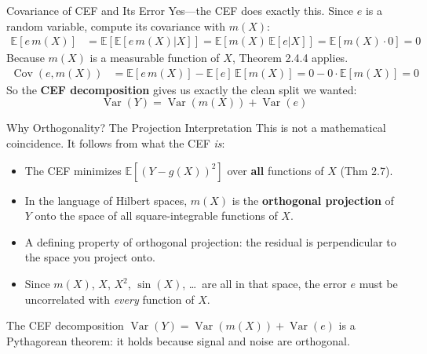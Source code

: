 \documentclass[aspectratio=169, handout, t]{beamer}
\numberwithin{equation}{section}
\begin{document}
\begin{frame}{Covariance of CEF and Its Error}
Yes---the CEF does exactly this.  Since $e$ is a random variable, compute its covariance with $m(X)$:
\begin{align*}
\mathbb{E}[e\, m(X)] & =  \mathbb{E}[\mathbb{E}[e\, m(X)|X]]=\mathbb{E}[m(X)\,\mathbb{E}[e|X]]=\mathbb{E}[m(X)\cdot 0]=0
\end{align*}\pause
Because $m(X)$ is a measurable function of $X$, Theorem 2.4.4 applies.\pause
\begin{align*}
\operatorname{Cov}(e , m(X)) & =  \mathbb{E}[e\, m(X)]- \mathbb{E}[e]\,\mathbb{E}[m(X)]=0- 0\cdot\mathbb{E}[m(X)]=0
\end{align*}\pause
So the \textbf{CEF decomposition} gives us exactly the clean split we wanted:
$$\operatorname{Var}(Y)=\operatorname{Var}(m(X))+\operatorname{Var}(e)$$
\end{frame}

\begin{frame}{Why Orthogonality? The Projection Interpretation}
This is not a mathematical coincidence.  It follows from what the CEF \emph{is}:

\begin{itemize}
\item The CEF minimizes $\mathbb{E}[(Y - g(X))^2]$ over \textbf{all} functions of $X$ (Thm 2.7).
\item In the language of Hilbert spaces, $m(X)$ is the \textbf{orthogonal projection} of $Y$ onto the space of all square-integrable functions of $X$.
\pause
\item A defining property of orthogonal projection: \alert{the residual is perpendicular to the space you project onto}.
\pause
\item Since $m(X)$, $X$, $X^2$, $\sin(X)$, \ldots\ are all in that space, the error $e$ must be uncorrelated with \emph{every} function of $X$.
\end{itemize}
\pause
\medskip
\begin{tcolorbox}[colback=blue!5, colframe=blue!50]
The CEF decomposition $\operatorname{Var}(Y)=\operatorname{Var}(m(X))+\operatorname{Var}(e)$ is a Pythagorean theorem: it holds because signal and noise are orthogonal.
\end{tcolorbox}
\end{frame}
\end{document}
